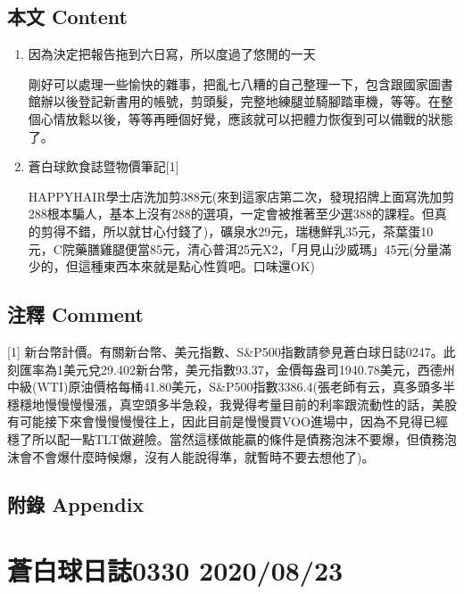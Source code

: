 \documentclass[a5paper, 11pt
]{book}
\begin{document}
\hypertarget{ux672cux6587-content-70}{%
\subsection{本文 Content}\label{ux672cux6587-content-70}}

\begin{enumerate}
\def\labelenumi{\arabic{enumi}.}
\item
  因為決定把報告拖到六日寫，所以度過了悠閒的一天

  剛好可以處理一些愉快的雜事，把亂七八糟的自己整理一下，包含跟國家圖書館辦以後登記新書用的帳號，剪頭髮，完整地練腿並騎腳踏車機，等等。在整個心情放鬆以後，等等再睡個好覺，應該就可以把體力恢復到可以備戰的狀態了。
\item
  蒼白球飲食誌暨物價筆記{[}1{]}

  HAPPYHAIR學士店洗加剪388元(來到這家店第二次，發現招牌上面寫洗加剪288根本騙人，基本上沒有288的選項，一定會被推著至少選388的課程。但真的剪得不錯，所以就甘心付錢了)，礦泉水29元，瑞穗鮮乳35元，茶葉蛋10元，C院藥膳雞腿便當85元，清心普洱25元X2，「月見山沙威瑪」45元(分量滿少的，但這種東西本來就是點心性質吧。口味還OK)
\end{enumerate}

\hypertarget{ux6ce8ux91cb-comment-70}{%
\subsection{注釋 Comment}\label{ux6ce8ux91cb-comment-70}}

{[}1{]}
新台幣計價。有關新台幣、美元指數、S\&P500指數請參見蒼白球日誌0247。此刻匯率為1美元兌29.402新台幣，美元指數93.37，金價每盎司1940.78美元，西德州中級(WTI)原油價格每桶41.80美元，S\&P500指數3386.4(張老師有云，真多頭多半穩穩地慢慢慢慢漲，真空頭多半急殺，我覺得考量目前的利率跟流動性的話，美股有可能接下來會慢慢慢慢往上，因此目前是慢慢買VOO進場中，因為不見得已經穩了所以配一點TLT做避險。當然這樣做能贏的條件是債務泡沫不要爆，但債務泡沫會不會爆什麼時候爆，沒有人能說得準，就暫時不要去想他了)。

\hypertarget{ux9644ux9304-appendix-70}{%
\subsection{附錄 Appendix}\label{ux9644ux9304-appendix-70}}

\hypertarget{ux84bcux767dux7403ux65e5ux8a8c0330-20200823}{%
\section{蒼白球日誌0330
2020/08/23}\label{ux84bcux767dux7403ux65e5ux8a8c0330-20200823}}
\end{document}
